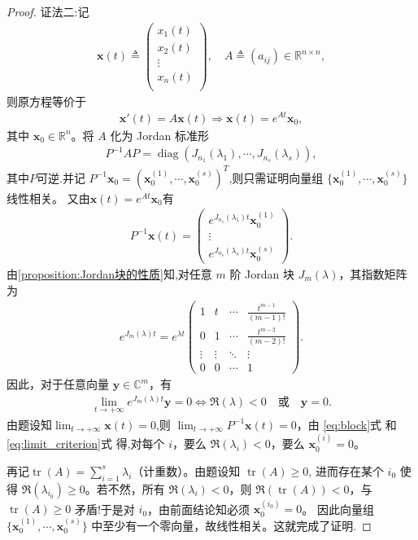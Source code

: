 \documentclass[../../main.tex]{subfiles}%
\begin{document}
\begin{proof}
{\color{blue}证法二:}记
\begin{align*}
\mathbf{x}(t)\triangleq \left( \begin{array}{c}
x_1(t)\\
x_2(t)\\
\vdots\\
x_n(t)\\
\end{array} \right) ,\quad A\triangleq (a_{ij})\in \mathbb{R} ^{n\times n},
\end{align*}
则原方程等价于
\begin{align*}
\mathbf{x}'(t)=A\mathbf{x}(t)\Longrightarrow \mathbf{x}(t)=e^{At}\mathbf{x}_0,
\end{align*}
其中 $\mathbf{x}_0\in\mathbb{R}^n$。将 $A$ 化为 Jordan 标准形
\begin{align*}
P^{-1}AP=\operatorname{diag}(J_{n_1}(\lambda_1),\cdots,J_{n_s}(\lambda_s)),
\end{align*}
其中$P$可逆.并记 $P^{-1}\mathbf{x}_0=(\mathbf{x}_0^{(1)},\cdots,\mathbf{x}_0^{(s)})^T$,则只需证明向量组
$\{\mathbf{x}_0^{(1)},\cdots,\mathbf{x}_0^{(s)}\}$ 线性相关。
又由$\mathbf{x}(t)=e^{At}\mathbf{x}_0$有
\begin{align}
P^{-1}\mathbf{x}(t)
=
\begin{pmatrix}
e^{J_{n_1}(\lambda_1)t}\mathbf{x}_0^{(1)} \\
\vdots \\
e^{J_{n_s}(\lambda_s)t}\mathbf{x}_0^{(s)}
\end{pmatrix}. \label{eq:block}
\end{align}
由\cref{proposition:Jordan块的性质}知,对任意 $m$ 阶 Jordan 块 $J_m(\lambda)$，其指数矩阵为
\begin{align*}
e^{J_m(\lambda)t}=e^{\lambda t}
\begin{pmatrix}
1 & t & \cdots & \frac{t^{m-1}}{(m-1)!} \\
0 & 1 & \cdots & \frac{t^{m-2}}{(m-2)!} \\
\vdots & \vdots & \ddots & \vdots \\
0 & 0 & \cdots & 1
\end{pmatrix}. 
\end{align*}
因此，对于任意向量 $\mathbf{y}\in\mathbb{C}^m$，有
\begin{align}
\lim_{t\to+\infty} e^{J_m(\lambda)t}\mathbf{y}=0
\iff \Re(\lambda)<0 \quad\text{或}\quad \mathbf{y}=0. \label{eq:limit_criterion}
\end{align}
由题设知$\lim_{t\to+\infty}\mathbf{x}(t)=0$,则 $\lim_{t\to+\infty}P^{-1}\mathbf{x}(t)=0$，由 \eqref{eq:block}式 和 \eqref{eq:limit_criterion}式 得,对每个 $i$，要么 $\Re(\lambda_i)<0$，要么 $\mathbf{x}_0^{(i)}=0$。

再记$\operatorname{tr}(A)=\sum_{i=1}^s \lambda_i$（计重数）。由题设知 $\operatorname{tr}(A)\geqslant 0$, 进而存在某个 $i_0$ 使得 $\Re(\lambda_{i_0})\geqslant 0$。若不然，所有 $\Re(\lambda_i)<0$，则 $\Re(\operatorname{tr}(A))<0$，与 $\operatorname{tr}(A)\geqslant 0$ 矛盾!于是对 $i_0$，由前面结论知必须 $\mathbf{x}_0^{(i_0)}=0$。
因此向量组 $\{\mathbf{x}_0^{(1)},\cdots,\mathbf{x}_0^{(s)}\}$ 中至少有一个零向量，故线性相关。这就完成了证明.
\end{proof}
\end{document}
